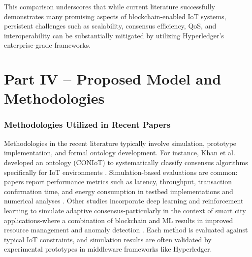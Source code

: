 \documentclass[12pt,onecolumn]{IEEEtran} %
\begin{document}
This comparison underscores that while current literature successfully demonstrates many promising aspects of blockchain-enabled IoT systems, persistent challenges such as scalability, consensus efficiency, QoS, and interoperability can be substantially mitigated by utilizing Hyperledger's enterprise-grade frameworks.
\clearpage 
\part*{Part IV – Proposed Model and Methodologies}

\section{Methodologies Utilized in Recent Papers}\label{sec:methods}
Methodologies in the recent literature typically involve simulation, prototype implementation, and formal ontology development. For instance, Khan et al. developed an ontology (CONIoT) to systematically classify consensus algorithms specifically for IoT environments \cite{khan2022asurveyand, khan2022asurveyand}. Simulation-based evaluations are common: papers report performance metrics such as latency, throughput, transaction confirmation time, and energy consumption in testbed implementations and numerical analyses \cite{ali2022blockchainenabledarchitecture, bryant2022keychallengesin}. Other studies incorporate deep learning and reinforcement learning to simulate adaptive consensus-particularly in the context of smart city applications-where a combination of blockchain and ML results in improved resource management and anomaly detection \cite{alam2023anoverviewof, guru2023asurveyon}. Each method is evaluated against typical IoT constraints, and simulation results are often validated by experimental prototypes in middleware frameworks like Hyperledger.
\end{document}
